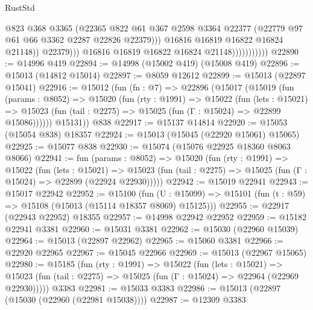 \begin{lexlean}{RustStd}
\begin{coremodule}
                                      @823
                                      @368
                                      @3365
                                      (@22365
                                        @822
                                        @61
                                        @367
                                        @2598
                                        @3364
                                        @22377
                                        (@22779 @97 @61 @66 @3362 @2287 @22826 @22379)))
                                    @16816
                                    @16819
                                    @16822
                                    @16824
                                    @21148))
                                @22379)))
                          @16816
                          @16819
                          @16822
                          @16824
                          @21148)))))))))))
@22890 := @14996 @419
@22894 := @14998 (@15002 @419) (@15008 @419)
@22896 := @15013 (@14812 @15014)
@22897 := @8059 @12612
@22899 := @15013 (@22897 @15041)
@22916 := @15012
    (fun (fn : @7) =>
    @22896
      (@15017
        (@15019
          (fun (params : @8052) =>
          @15020
            (fun (rty : @1991) =>
            @15022
              (fun (lets : @15021) =>
              @15023 (fun (tail : @2275) => @15025 (fun (Γ : @15024) => @22899 @15086))))))
        @15131))
    @838
@22917 := @15137 @14814
@22920 := @15053 (@15054 @838) @18357
@22924 := @15013 (@15045 (@22920 @15061) @15065)
@22925 := @15077 @838
@22930 := @15074 (@15076 @22925 @18360 @8063 @8066)
@22941 := fun (params : @8052) =>
  @15020
    (fun (rty : @1991) =>
    @15022
      (fun (lets : @15021) =>
      @15023 (fun (tail : @2275) => @15025 (fun (Γ : @15024) => @22899 (@22924 @22930)))))
@22942 := @15019 @22941
@22943 := @15017 @22942
@22952 := @15100
    (fun (U : @15099) => @15101 (fun (t : @59) => @15108 (@15013 (@15114 @18357 @8069) @15125)))
@22955 := @22917 (@22943 @22952) @18355
@22957 := @14998 @22942 @22952
@22959 := @15182 @22941 @3381
@22960 := @15031 @3381
@22962 := @15030 (@22960 @15039)
@22964 := @15013 (@22897 @22962)
@22965 := @15060 @3381
@22966 := @22920 @22965
@22967 := @15045 @22966
@22969 := @15013 (@22967 @15065)
@22980 := @15185
    (fun (rty : @1991) =>
    @15022
      (fun (lets : @15021) =>
      @15023 (fun (tail : @2275) => @15025 (fun (Γ : @15024) => @22964 (@22969 @22930)))))
    @3383
@22981 := @15033 @3383
@22986 := @15013 (@22897 (@15030 (@22960 (@22981 @15038))))
@22987 := @12309 @3383

\end{coremodule}
\end{lexlean}
